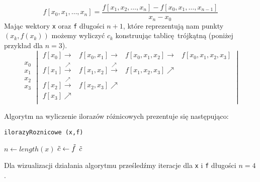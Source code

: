 \documentclass[a4paper]{article}
\begin{document}
    \[ f[x_0, x_1, \dots, x_n] = \frac{f[x_1,x_2,\dots,x_n] - f[x_0,x_1,\dots,x_{n-1}]}{x_n - x_0}\]
    Mając wektory \texttt{x} oraz \texttt{f} długości $n+1$, które reprezentują nam punkty $(x_k, f(x_k))$ możemy wyliczyć $c_k$ konstruując tablicę trójkątną (poniżej przykład dla $n = 3$).
    \[
    \begin{matrix}
        x_0 \\
        x_1 \\
        x_2 \\
        x_3 \\
    \end{matrix}
    \begin{vmatrix}
    f[x_0] \rightarrow   & f[x_0,x_1] \rightarrow & f[x_0, x_1, x_2] \rightarrow  & f[x_0, x_1, x_2, x_3] \\
    f[x_1] \overset{\nearrow}{\rightarrow}   & f[x_1,x_2] \overset{\nearrow}{\rightarrow} & f[x_1, x_2, x_3] \nearrow  & \\
    f[x_2] \overset{\nearrow}{\rightarrow}   & f[x_2,x_3] \nearrow &  & \\
    f[x_3] \nearrow   &  &  & \\
    \end{vmatrix}
    \]

    Algorytm na wyliczenie ilorazów różnicowych prezentuje się następująco:
        \begin{algorithm}
            \caption{\texttt{ilorazyRoznicowe (x,f)}}\label{alg:one}
            $n \gets length(x)$\;
            $\Tilde{c} \gets \Tilde{f}$\;
            \Return $\Tilde{c}$\;
        \end{algorithm}

    Dla wizualizacji działania algorytmu prześledźmy iteracje dla \texttt{x} i \texttt{f} długości $n=4$.
      
\end{document}
